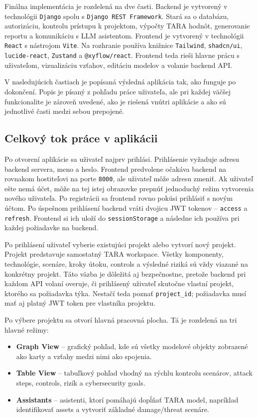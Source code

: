 \documentclass[11pt]{article}
\begin{document}
Finálna implementácia je rozdelená na dve časti. Backend je vytvorený v technológii \texttt{Django} spolu s \texttt{Django REST Framework}. Stará sa o databázu, autorizáciu, kontrolu prístupu k projektom, výpočty TARA hodnôt, generovanie reportu a komunikáciu s LLM asistentom. Frontend je vytvorený v technológii \texttt{React} s nástrojom \texttt{Vite}. Na rozhranie používa knižnice \texttt{Tailwind}, \texttt{shadcn/ui}, \texttt{lucide-react}, \texttt{Zustand} a \texttt{@xyflow/react}. Frontend teda rieši hlavne prácu s uživateľom, vizualizáciu vzťahov, editáciu modelov a volanie backend API.

V nasledujúcich častiach je popísaná výsledná aplikácia tak, ako funguje po dokončení. Popis je písaný z pohľadu práce uživateľa, ale pri každej väčšej funkcionalite je zároveň uvedené, ako je riešená vnútri aplikácie a ako sú jednotlivé časti medzi sebou prepojené.

\subsection{Celkový tok práce v aplikácii}

Po otvorení aplikácie sa uživateľ najprv prihlási. Prihlásenie vyžaduje adresu backend servera, meno a heslo. Frontend predvolene očakáva backend na rovnakom hostiteľovi na porte \texttt{8000}, ale uživateľ môže adresu zmeniť. Ak uživateľ ešte nemá účet, môže na tej istej obrazovke prepnúť jednoduchý režim vytvorenia nového uživateľa. Po registrácii sa frontend rovno pokúsi prihlásiť s novým účtom. Po úspešnom prihlásení backend vráti dvojicu JWT tokenov -- \texttt{access} a \texttt{refresh}. Frontend si ich uloží do \texttt{sessionStorage} a následne ich používa pri každej požiadavke na backend.

Po prihlásení uživateľ vyberie existujúci projekt alebo vytvorí nový projekt. Projekt predstavuje samostatný TARA workspace. Všetky komponenty, technológie, scenáre, kroky útoku, controls a výsledné riziká sú vždy viazané na konkrétny projekt. Táto väzba je dôležitá aj bezpečnostne, pretože backend pri každom API volaní overuje, či prihlásený uživateľ skutočne vlastní projekt, ktorého sa požiadavka týka. Nestačí teda poznať \texttt{project\_id}; požiadavka musí mať aj platný JWT token pre vlastníka projektu.

Po výbere projektu sa otvorí hlavná pracovná plocha. Tá je rozdelená na tri hlavné režimy:

\begin{itemize}
    \item \textbf{Graph View} -- grafický pohľad, kde sú všetky modelové objekty zobrazené ako karty a vzťahy medzi nimi ako spojenia.
    \item \textbf{Table View} -- tabuľkový pohľad vhodný na rýchlu kontrolu scenárov, attack steps, controls, rizík a cybersecurity goals.
    \item \textbf{Assistants} -- asistenti, ktorí pomáhajú dopĺňať TARA model, napríklad identifikovať assets a vytvoriť základné damage/threat scenáre.
\end{itemize}
\end{document}

